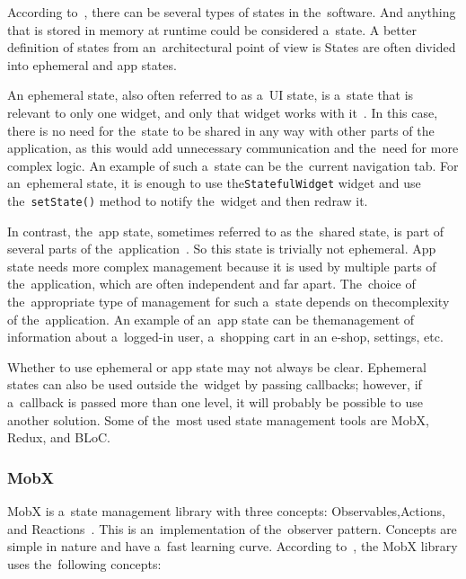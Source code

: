 According to~\cite{a2022_differentiate}, there can be several types of states in the~software.
And anything that is stored in memory at runtime could be considered a~state.
A better definition of states from an~architectural point of view is 
States are often divided into ephemeral and app states.

An ephemeral state, also often referred to as a~UI state, is a~state that is relevant to only one widget, and only that widget works with it~\cite{a2022_differentiate}.
In this case, there is no need for the~state to be shared in any way with other parts of the application, as this would add unnecessary communication and the~need for more complex logic.
An example of such a~state can be the~current navigation tab.
For an~ephemeral state, it is enough to use the\linebreak{}\texttt{StatefulWidget} widget and use the~\texttt{setState()} method to notify the~widget and then redraw it.

In contrast, the~app state, sometimes referred to as the~shared state, is part of several parts of the~application~\cite{a2022_differentiate}.
So this state is trivially not ephemeral.
App state needs more complex management because it is used by multiple parts of the~application, which are often independent and far apart.
The~choice of the~appropriate type of management for such a~state depends on the\linebreak{}complexity of the~application.
An example of an~app state can be the\linebreak{}management of information about a~logged-in user, a~shopping cart in an \mbox{e-shop}, settings, etc.

Whether to use ephemeral or app state may not always be clear.
\linebreak
Ephemeral states can also be used outside the~widget by passing callbacks; however, if a~callback is passed more than one level, it will probably be possible to use another solution.
Some of the~most used state management tools are MobX, Redux, and BLoC.

\subsubsection{MobX}

MobX is a~state management library with three concepts: Observables,\linebreak{}Actions, and Reactions~\cite{a2022_mobxdart}.
This is an~implementation of the~observer \mbox{pattern}.
Concepts are simple in nature and have a~fast learning curve.
According to~\cite{a2022_mobxdart}, the MobX library uses the~following concepts:

